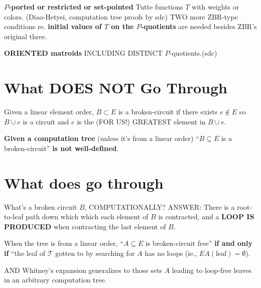 \documentclass{article}
\begin{document}
\noindent \textbf{$P$-ported or restricted or set-pointed} Tutte functions
$T$ with weights or colors.  
(Diao-Hetyei, computation tree proofs by sdc)  
TWO more ZBR-type conditions re. \textbf{initial values of $T$ on 
the $P$-quotients} are needed besides ZBR's original three.

\vfill


\noindent \textbf{ORIENTED matroids}
 INCLUDING DISTINCT $P$-quotients.(sdc)

\newpage
\section{What DOES NOT Go Through}

Given a linear element order, $B\subset E$ is a broken-circuit if there
exists $e\not\in E$ so $B\cup e$ is a circuit and $e$ is the (FOR US!) 
GREATEST element in $B\cup e$.

\textbf{Given a computation tree} (unless it's from a linear order) 
``$B\subseteq E$ is a broken-circuit'' \textbf{is not well-defined}.  



\vfill

\section{What does go through}


What's a broken circuit $B$, COMPUTATIONALLY?  ANSWER:  There is a 
root-to-leaf path down which which each element of $B$ is contracted, and
a \textbf{LOOP IS PRODUCED} when contracting the last element of $B$.



When the tree is from a linear order, 
``$A\subseteq E$ is broken-circuit free'' \textbf{if and only if}
``the leaf of $\mathcal{T}$ gotten to by searching for $A$ has no loops
(ie., $EA(\text{leaf})=\emptyset$).

AND Whitney's expansion generalizes to those sets $A$ leading to loop-free
leaves in an arbitrary computation tree.











\newpage


\end{document}

